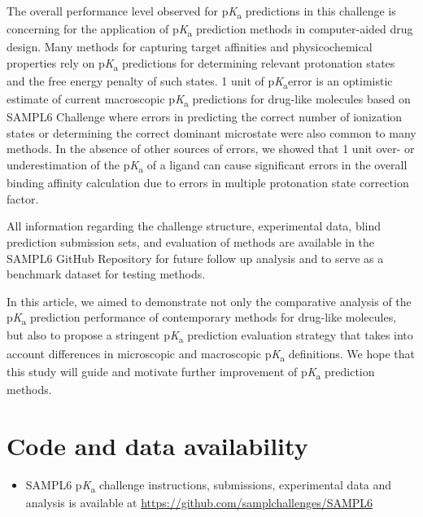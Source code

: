 \documentclass[9pt,lineno,final]{elife}
\newcommand{\pKa}{p\textit{K}\textsubscript{a}}
\begin{document}
The overall performance level observed for \pKa{} predictions in this challenge is concerning for the application of \pKa{} prediction methods in computer-aided drug design. Many methods for capturing target affinities and physicochemical properties rely on \pKa{} predictions for determining relevant protonation states and the free energy penalty of such states. 1 unit of \pKa error is an optimistic estimate of current macroscopic \pKa{} predictions for drug-like molecules based on SAMPL6 Challenge where errors in predicting the correct number of ionization states or determining the correct dominant microstate were also common to many methods. In the absence of other sources of errors, we showed that 1 unit over- or underestimation of the \pKa{} of a ligand can cause significant errors in the overall binding affinity calculation due to errors in multiple protonation state correction factor. 

All information regarding the challenge structure, experimental data, blind prediction submission sets, and evaluation of methods are available in the SAMPL6 GitHub Repository for future follow up analysis and to serve as a benchmark dataset for testing methods. 

In this article, we aimed to demonstrate not only the comparative analysis of the \pKa{} prediction performance of contemporary methods for drug-like molecules, but also to propose a stringent \pKa{} prediction evaluation strategy that takes into account differences in microscopic and macroscopic \pKa{} definitions. We hope that this study will guide and motivate further improvement of \pKa{} prediction methods.



\section{Code and data availability} \label{Code-and-Data-Availability}
\begin{minipage}{15cm}
\begin{itemize}

\item SAMPL6 \pKa{} challenge instructions, submissions, experimental data and analysis is available at  \href{https://github.com/samplchallenges/SAMPL6}{https://github.com/samplchallenges/SAMPL6}

\end{itemize}
\end{minipage}
\end{document}
